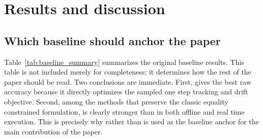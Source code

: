 \section{Results and discussion}

\subsection{Which baseline should anchor the paper}

Table~\ref{tab:baseline_summary} summarizes the original baseline results. This table is not included merely for completeness; it determines how the rest of the paper should be read. Two conclusions are immediate. First, \methodthree{} gives the best raw accuracy because it directly optimizes the sampled one step tracking and drift objective. Second, among the methods that preserve the classic equality constrained formulation, \methodtwo{} is clearly stronger than \methodone{} in both offline and real time execution. This is precisely why \methodtwo{} rather than \methodthree{} is used as the baseline anchor for the main contribution of the paper.

\begin{table}[H]
  \centering
  \caption{Summary of the original baseline methods.}
  \label{tab:baseline_summary}
  \small
  \setlength{\tabcolsep}{4pt}
  \renewcommand{\arraystretch}{1.08}
\end{table}

